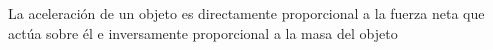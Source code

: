 \documentclass[preview]{standalone}
\begin{document}
\begin{center}
La aceleración de un objeto es directamente proporcional
 a la fuerza neta que actúa sobre él e inversamente
 proporcional a la masa del objeto
\end{center}
\end{document}
